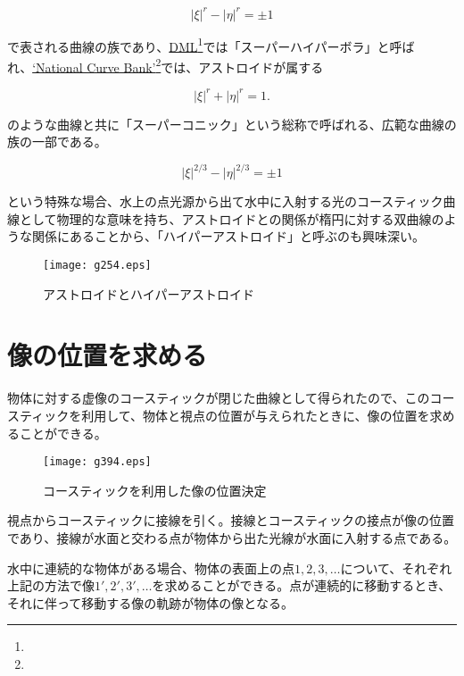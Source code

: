 \documentclass[twocolumn]{article}
\begin{document}
	$$ \left| \xi \right|^{r} - \left| \eta \right|^{r} = \pm1 $$
	
	で表される曲線の族であり、\href{http://dynamicmathematicslearning.com/super-ellipse.html}{DML}\footnote{}では「スーパーハイパーボラ」と呼ばれ、\href{https://old.nationalcurvebank.org/superconicncb/superconicncbb.htm}{`National Curve Bank'}\footnote{}では、アストロイドが属する
	
	$$ \left| \xi \right|^{r} + \left| \eta \right|^{r} = 1. $$
	
	のような曲線と共に「スーパーコニック」という総称で呼ばれる、広範な曲線の族の一部である。
	
	$$ \left| \xi \right|^{2/3} - \left| \eta \right|^{2/3} = \pm1 $$
	
	という特殊な場合、水上の点光源から出て水中に入射する光のコースティック曲線として物理的な意味を持ち、アストロイドとの関係が楕円に対する双曲線のような関係にあることから、「ハイパーアストロイド」と呼ぶのも興味深い。
	
	\begin{figure}
		\centering
		\texttt{[image: g254.eps]}
		\caption{アストロイドとハイパーアストロイド}
		\label{fig:hyperastroid}
	\end{figure}
	
	\section{像の位置を求める}
	
	物体に対する虚像のコースティックが閉じた曲線として得られたので、このコースティックを利用して、物体と視点の位置が与えられたときに、像の位置を求めることができる。
	
	\begin{figure}[ht]
		\centering
		\texttt{[image: g394.eps]}
		\caption{コースティックを利用した像の位置決定}
		\label{fig:image_caustic}
	\end{figure}
	
	視点からコースティックに接線を引く。接線とコースティックの接点が像の位置であり、接線が水面と交わる点が物体から出た光線が水面に入射する点である。
	
	水中に連続的な物体がある場合、物体の表面上の点$1, 2, 3, \dots$について、それぞれ上記の方法で像$1', 2', 3', \dots$を求めることができる。点が連続的に移動するとき、それに伴って移動する像の軌跡が物体の像となる。
	
\end{document}

